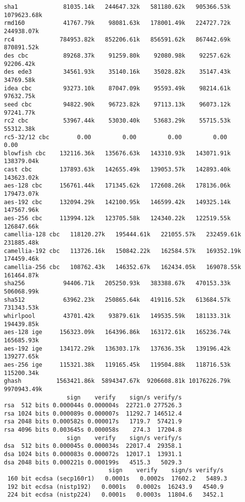 \documentclass[%
 aip,
 jmp,%
 amsmath,amssymb,
 reprint,%
]{revtex4-1}
\begin{document}
\begin{verbatim}
sha1             81035.14k   244647.32k   581180.62k   905366.53k  1079623.68k
rmd160           41767.79k    98081.63k   178001.49k   224727.72k   244938.07k
rc4             784953.82k   852206.61k   856591.62k   867442.69k   870891.52k
des cbc          89268.37k    91259.80k    92080.98k    92257.62k    92206.42k
des ede3         34561.93k    35140.16k    35028.82k    35147.43k    34769.58k
idea cbc         93273.10k    87047.09k    95593.49k    98214.61k    97632.75k
seed cbc         94822.90k    96723.82k    97113.13k    96073.12k    97241.77k
rc2 cbc          53967.44k    53030.40k    53683.29k    55715.53k    55312.38k
rc5-32/12 cbc        0.00         0.00         0.00         0.00         0.00 
blowfish cbc    132116.36k   135676.63k   143310.93k   143071.91k   138379.04k
cast cbc        137893.63k   142655.49k   139053.57k   142893.40k   143623.02k
aes-128 cbc     156761.44k   171345.62k   172608.26k   178136.06k   179473.07k
aes-192 cbc     132094.29k   142100.95k   146599.42k   149325.14k   147567.96k
aes-256 cbc     113994.12k   123705.58k   124340.22k   122519.55k   126847.66k
camellia-128 cbc   118120.27k   195444.61k   221055.57k   232459.61k   231885.48k
camellia-192 cbc   113726.16k   150842.22k   162584.57k   169352.19k   174459.46k
camellia-256 cbc   108762.43k   146352.67k   162434.05k   169078.55k   161464.87k
sha256           94406.71k   205250.93k   383388.67k   470153.33k   506068.99k
sha512           63962.23k   250865.64k   419116.52k   613684.57k   731343.53k
whirlpool        43701.42k    93879.61k   149535.59k   181133.31k   194439.85k
aes-128 ige     156323.09k   164396.86k   163172.61k   165236.74k   165685.93k
aes-192 ige     134172.29k   136303.17k   137636.35k   139196.42k   139277.65k
aes-256 ige     115321.38k   119165.45k   119504.88k   118716.53k   115200.34k
ghash          1563421.86k  5894347.67k  9206608.81k 10176226.79k  9970943.49k
                  sign    verify    sign/s verify/s
rsa  512 bits 0.000044s 0.000004s  22721.0 277526.3
rsa 1024 bits 0.000089s 0.000007s  11292.7 146512.4
rsa 2048 bits 0.000582s 0.000017s   1719.7  57421.9
rsa 4096 bits 0.003645s 0.000058s    274.3  17204.8
                  sign    verify    sign/s verify/s
dsa  512 bits 0.000045s 0.000034s  22017.4  29358.1
dsa 1024 bits 0.000083s 0.000072s  12017.1  13931.1
dsa 2048 bits 0.000221s 0.000199s   4515.3   5029.3
                              sign    verify    sign/s verify/s
 160 bit ecdsa (secp160r1)   0.0001s   0.0002s  17602.2   5489.3
 192 bit ecdsa (nistp192)   0.0001s   0.0002s  16243.9   4540.9
 224 bit ecdsa (nistp224)   0.0001s   0.0003s  11804.6   3452.1

\end{verbatim}
\end{document}
